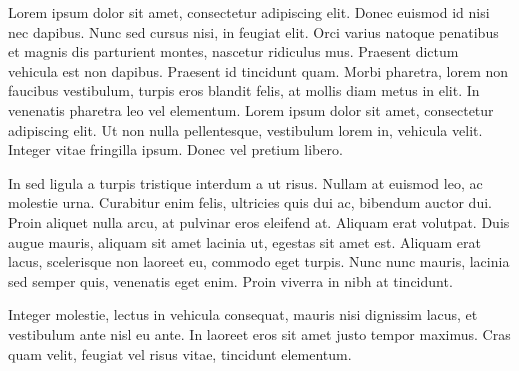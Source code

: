 \documentclass{article}
\begin{document}
{    Lorem ipsum dolor sit amet, consectetur adipiscing elit. Donec euismod id nisi nec dapibus. Nunc sed cursus nisi, in feugiat elit. Orci varius natoque penatibus et magnis dis parturient montes, nascetur ridiculus mus. Praesent dictum vehicula est non dapibus. Praesent id tincidunt quam. Morbi pharetra, lorem non faucibus vestibulum, turpis eros blandit felis, at mollis diam metus in elit. In venenatis pharetra leo vel elementum. Lorem ipsum dolor sit amet, consectetur adipiscing elit. Ut non nulla pellentesque, vestibulum lorem in, vehicula velit. Integer vitae fringilla ipsum. Donec vel pretium libero.
    
    In sed ligula a turpis tristique interdum a ut risus. Nullam at euismod leo, ac molestie urna. Curabitur enim felis, ultricies quis dui ac, bibendum auctor dui. Proin aliquet nulla arcu, at pulvinar eros eleifend at. Aliquam erat volutpat. Duis augue mauris, aliquam sit amet lacinia ut, egestas sit amet est. Aliquam erat lacus, scelerisque non laoreet eu, commodo eget turpis. Nunc nunc mauris, lacinia sed semper quis, venenatis eget enim. Proin viverra in nibh at tincidunt.
    
    Integer molestie, lectus in vehicula consequat, mauris nisi dignissim lacus, et vestibulum ante nisl eu ante. In laoreet eros sit amet justo tempor maximus. Cras quam velit, feugiat vel risus vitae, tincidunt elementum.

}
\end{document}
